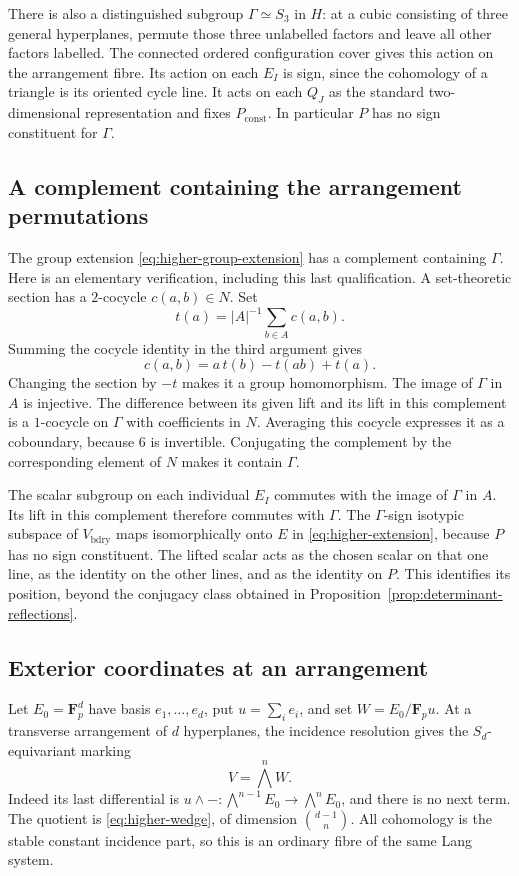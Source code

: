 There is also a distinguished subgroup $\Gamma\simeq S_3$ in $H$: at a cubic consisting of three general hyperplanes, permute those three unlabelled factors and leave all other factors labelled. The connected ordered configuration cover gives this action on the arrangement fibre. Its action on each $E_I$ is sign, since the cohomology of a triangle is its oriented cycle line. It acts on each $Q_J$ as the standard two-dimensional representation and fixes $P_{\mathrm{const}}$. In particular $P$ has no sign constituent for $\Gamma$.

\subsection{A complement containing the arrangement permutations}
The group extension \eqref{eq:higher-group-extension} has a complement containing $\Gamma$. Here is an elementary verification, including this last qualification. A set-theoretic section has a $2$-cocycle $c(a,b)\in N$. Set
\[
t(a)=|A|^{-1}\sum_{b\in A}c(a,b).
\]
Summing the cocycle identity in the third argument gives
\[
c(a,b)=a\,t(b)-t(ab)+t(a).
\]
Changing the section by $-t$ makes it a group homomorphism. The image of $\Gamma$ in $A$ is injective. The difference between its given lift and its lift in this complement is a $1$-cocycle on $\Gamma$ with coefficients in $N$. Averaging this cocycle expresses it as a coboundary, because $6$ is invertible. Conjugating the complement by the corresponding element of $N$ makes it contain $\Gamma$.

The scalar subgroup on each individual $E_I$ commutes with the image of $\Gamma$ in $A$. Its lift in this complement therefore commutes with $\Gamma$. The $\Gamma$-sign isotypic subspace of $V_{\mathrm{bdry}}$ maps isomorphically onto $E$ in \eqref{eq:higher-extension}, because $P$ has no sign constituent. The lifted scalar acts as the chosen scalar on that one line, as the identity on the other lines, and as the identity on $P$. This identifies its position, beyond the conjugacy class obtained in Proposition~\ref{prop:determinant-reflections}.

\subsection{Exterior coordinates at an arrangement}
Let $E_0=\mathbf F_p^d$ have basis $e_1,\ldots,e_d$, put $u=\sum_i e_i$, and set $W=E_0/\mathbf F_pu$. At a transverse arrangement of $d$ hyperplanes, the incidence resolution gives the $S_d$-equivariant marking
\begin{equation}\label{eq:higher-wedge}
V=\bigwedge^nW.
\end{equation}
Indeed its last differential is $u\wedge-:\bigwedge^{n-1}E_0\to\bigwedge^nE_0$, and there is no next term. The quotient is \eqref{eq:higher-wedge}, of dimension $\binom{d-1}n$. All cohomology is the stable constant incidence part, so this is an ordinary fibre of the same Lang system.


